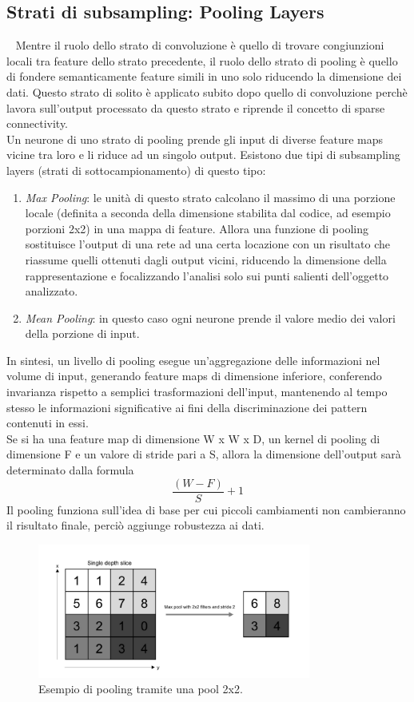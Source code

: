 \subsection{Strati di subsampling: Pooling Layers}~\cite{cnn2}
Mentre il ruolo dello strato di convoluzione è quello di trovare congiunzioni locali tra feature
dello strato precedente, il ruolo dello strato di pooling è quello di fondere
 semanticamente feature simili in uno solo riducendo la dimensione dei dati.
Questo strato di solito è applicato subito dopo quello di convoluzione perchè lavora sull’output
 processato da questo strato e riprende il concetto di sparse connectivity.\\
  Un neurone di uno strato di pooling prende gli input di diverse feature maps
   vicine tra loro e li riduce ad un singolo output. 
Esistono due tipi di subsampling layers (strati di sottocampionamento) di questo tipo:\\
\begin{enumerate}
     \item \emph{Max Pooling}: le unità di questo strato calcolano il massimo di una porzione locale (definita a seconda della dimensione stabilita dal codice, ad esempio porzioni 2x2) in una mappa di feature. Allora una funzione di pooling sostituisce l’output di una rete ad una certa locazione con un risultato che riassume quelli ottenuti dagli output vicini, riducendo la dimensione della rappresentazione e focalizzando l’analisi solo sui punti salienti dell’oggetto analizzato. 
\item \emph{Mean Pooling}: in questo caso ogni neurone prende il valore medio dei valori 
della porzione di input. 
\end{enumerate}
In sintesi, un livello di pooling esegue un’aggregazione delle informazioni nel volume di input, 
generando feature maps di dimensione inferiore, conferendo invarianza rispetto 
a semplici trasformazioni dell’input, mantenendo al tempo stesso
le informazioni significative ai fini della discriminazione dei pattern contenuti in essi.\\
Se si ha una feature map di dimensione W x W x D, un kernel di pooling di dimensione F 
e un valore di stride pari a S, allora la dimensione dell’output sarà determinato dalla formula 
\[\frac{(W - F)}{S}+1\]
Il pooling funziona sull’idea di base per cui piccoli cambiamenti non cambieranno 
il risultato finale, perciò aggiunge robustezza ai dati. 
\begin{figure}[H]
     \centering
     \includegraphics[width=0.8\textwidth]{Figures/pooling-ex.PNG}
     \caption{\small{
         Esempio di pooling tramite una pool 2x2. ~\cite{cnn2}
          }
     } %
     \label{fi:dcalc}
   \end{figure}
